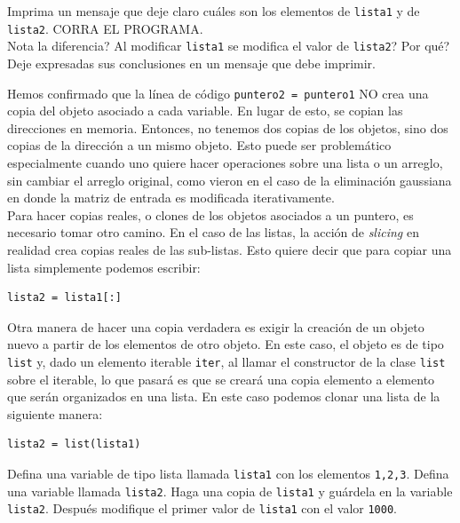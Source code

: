 \documentclass[11pt,letterpaper]{exam}
\begin{document}
\begin{questions}
Imprima un mensaje que deje claro cu\'ales son los elementos de \verb"lista1" y de \verb"lista2". CORRA EL PROGRAMA.\\

Nota la diferencia? Al modificar \verb"lista1" se modifica el valor de \verb"lista2"? Por qu\'e? Deje expresadas sus conclusiones en un mensaje que debe imprimir.


Hemos confirmado que la l\'inea de c\'odigo \verb"puntero2 = puntero1" NO crea una copia del objeto asociado a cada variable. En lugar de esto, se copian las direcciones en memoria. Entonces, no tenemos dos copias de los objetos, sino dos copias de la direcci\'on a un mismo objeto. Esto puede ser problem\'atico especialmente cuando uno quiere hacer operaciones sobre una lista o un arreglo, sin cambiar el arreglo original, como vieron en el caso de la eliminaci\'on gaussiana en donde la matriz de entrada es modificada iterativamente.\\

Para hacer copias reales, o clones de los objetos asociados a un puntero, es necesario tomar otro camino. En el caso de las listas, la acci\'on de \textit{slicing} en realidad crea copias reales de las sub-listas. Esto quiere decir que para copiar una lista simplemente podemos escribir:\\

\begin{verbatim}
lista2 = lista1[:]
\end{verbatim}

Otra manera de hacer una copia verdadera es exigir la creaci\'on de un objeto nuevo a partir de los elementos de otro objeto. En este caso, el objeto es de tipo \verb"list" y, dado un elemento iterable \verb"iter", al llamar el constructor de la clase \verb"list" sobre el iterable, lo que pasar\'a es que se crear\'a una copia elemento a elemento que ser\'an organizados en una lista. En este caso podemos clonar una lista de la siguiente manera:

\begin{verbatim}
lista2 = list(lista1)
\end{verbatim}
 
Defina una variable de tipo lista llamada \verb"lista1" con los elementos \verb"1,2,3". Defina una variable llamada \verb"lista2". Haga una copia de \verb"lista1" y gu\'ardela en la variable \verb"lista2". Despu\'es modifique el primer valor de \verb"lista1" con el valor \verb"1000".\\


\end{questions}
\end{document}

